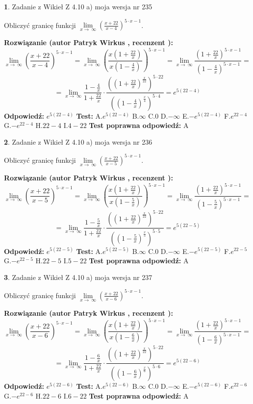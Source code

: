 \documentclass[12pt, a4paper]{article}
\theoremstyle{definition} %
\newtheorem{zad}{}
\newcommand{\zadStart}[1]{\begin{zad}#1\newline}
\newcommand{\zadStop}{\end{zad}}
\newcommand{\rozwStart}[2]{\noindent \textbf{Rozwiązanie (autor #1 , recenzent #2): }\newline}
\newcommand{\rozwStop}{\newline}
\newcommand{\odpStart}{\noindent \textbf{Odpowiedź:}\newline}
\newcommand{\odpStop}{\newline}
\newcommand{\testStart}{\noindent \textbf{Test:}\newline}
\newcommand{\testStop}{\newline}
\newcommand{\kluczStart}{\noindent \textbf{Test poprawna odpowiedź:}\newline}
\newcommand{\kluczStop}{\newline}
\begin{document}
\zadStart{Zadanie z Wikieł Z 4.10 a) moja wersja nr 235}


Obliczyć granicę funkcji  $\lim\limits_{x\to\ \infty}(\frac{x+22}{x-4})^{5\cdot x-1}$.
\zadStop
\rozwStart{Patryk Wirkus}{}
$$\lim\limits_{x\to\ \infty}(\frac{x+22}{x-4})^{5\cdot x-1} = \lim\limits_{x\to\ \infty}(\frac{x(1+\frac{22}{x})}{x(1-\frac{4}{x})})^{5\cdot x-1}=\lim\limits_{x\to\ \infty}\frac{(1+\frac{22}{x})^{5\cdot x-1}}{(1-\frac{4}{x})^{5\cdot x-1}}=$$
$$=\lim\limits_{x\to\ \infty}\frac{1-\frac{4}{x}}{1+\frac{22}{x}}\cdot\frac{((1+\frac{22}{x})^{\frac{x}{22}})^{5\cdot22}}{((1-\frac{4}{x})^{\frac{x}{4}})^{5\cdot4}}=e^{5(22-4)}$$
\rozwStop
\odpStart
$e^{5(22-4)}$
\odpStop
\testStart
A.$e^{5(22-4)}$ B.$\infty$ C.$0$ D.$-\infty$ E.$-e^{5(22-4)}$
F.$e^{22-4}$ G.$-e^{22-4}$
H.$22-4$
I.$4-22$
\testStop
\kluczStart
A
\kluczStop



\zadStart{Zadanie z Wikieł Z 4.10 a) moja wersja nr 236}


Obliczyć granicę funkcji  $\lim\limits_{x\to\ \infty}(\frac{x+22}{x-5})^{5\cdot x-1}$.
\zadStop
\rozwStart{Patryk Wirkus}{}
$$\lim\limits_{x\to\ \infty}(\frac{x+22}{x-5})^{5\cdot x-1} = \lim\limits_{x\to\ \infty}(\frac{x(1+\frac{22}{x})}{x(1-\frac{5}{x})})^{5\cdot x-1}=\lim\limits_{x\to\ \infty}\frac{(1+\frac{22}{x})^{5\cdot x-1}}{(1-\frac{5}{x})^{5\cdot x-1}}=$$
$$=\lim\limits_{x\to\ \infty}\frac{1-\frac{5}{x}}{1+\frac{22}{x}}\cdot\frac{((1+\frac{22}{x})^{\frac{x}{22}})^{5\cdot22}}{((1-\frac{5}{x})^{\frac{x}{5}})^{5\cdot5}}=e^{5(22-5)}$$
\rozwStop
\odpStart
$e^{5(22-5)}$
\odpStop
\testStart
A.$e^{5(22-5)}$ B.$\infty$ C.$0$ D.$-\infty$ E.$-e^{5(22-5)}$
F.$e^{22-5}$ G.$-e^{22-5}$
H.$22-5$
I.$5-22$
\testStop
\kluczStart
A
\kluczStop



\zadStart{Zadanie z Wikieł Z 4.10 a) moja wersja nr 237}


Obliczyć granicę funkcji  $\lim\limits_{x\to\ \infty}(\frac{x+22}{x-6})^{5\cdot x-1}$.
\zadStop
\rozwStart{Patryk Wirkus}{}
$$\lim\limits_{x\to\ \infty}(\frac{x+22}{x-6})^{5\cdot x-1} = \lim\limits_{x\to\ \infty}(\frac{x(1+\frac{22}{x})}{x(1-\frac{6}{x})})^{5\cdot x-1}=\lim\limits_{x\to\ \infty}\frac{(1+\frac{22}{x})^{5\cdot x-1}}{(1-\frac{6}{x})^{5\cdot x-1}}=$$
$$=\lim\limits_{x\to\ \infty}\frac{1-\frac{6}{x}}{1+\frac{22}{x}}\cdot\frac{((1+\frac{22}{x})^{\frac{x}{22}})^{5\cdot22}}{((1-\frac{6}{x})^{\frac{x}{6}})^{5\cdot6}}=e^{5(22-6)}$$
\rozwStop
\odpStart
$e^{5(22-6)}$
\odpStop
\testStart
A.$e^{5(22-6)}$ B.$\infty$ C.$0$ D.$-\infty$ E.$-e^{5(22-6)}$
F.$e^{22-6}$ G.$-e^{22-6}$
H.$22-6$
I.$6-22$
\testStop
\kluczStart
A
\kluczStop
\end{document}
